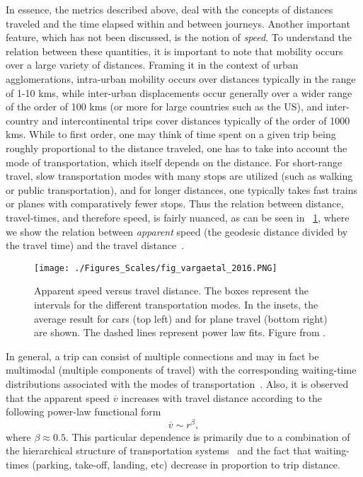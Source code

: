 In essence, the metrics described above, deal with the concepts of distances traveled and the time elapsed within and between journeys. Another important feature, which has not been discussed, is the notion of \emph{speed}. To understand the relation between these quantities, it is important to note that mobility occurs over a large variety of distances. Framing it in the context of urban agglomerations, intra-urban mobility occurs over distances typically in the range of 1-10 kms, while inter-urban displacements occur generally over a wider range of the order of 100 kms (or more for large countries such as the US), and inter-country and intercontinental trips cover distances typically of the order of 1000 kms. While to first order, one may think of time spent on a given trip being roughly proportional to the distance traveled, one has to take into account the mode of transportation, which itself depends on the distance. For short-range travel, slow transportation modes with many stops are utilized (such as walking or public transportation), and for longer distances, one typically takes fast trains or planes with comparatively fewer stops. Thus the relation between distance, travel-times, and therefore speed, is fairly nuanced, as can be seen in \figurename~\ref{fig:scales_varga}, where we show the relation between \emph{apparent} speed (\ie the geodesic  distance divided by the travel time) and the travel distance~\cite{varga_2016_further}.

\begin{figure}[t!]
  \centering
\texttt{[image: ./Figures\_Scales/fig\_vargaetal\_2016.PNG]}
  \caption{Apparent speed versus travel distance. The boxes represent the intervals for the different transportation modes. In the insets, the average result for cars (top left) and for plane travel (bottom right) are shown. The dashed lines represent power law fits. Figure from \cite{varga_2016_further}.}
\label{fig:scales_varga}
\end{figure}

 
In general, a trip can consist of multiple connections and may in fact be multimodal (multiple components of travel) with the corresponding waiting-time distributions associated with the modes of transportation~\cite{gallotti_2014_anatomy}. Also, it is observed that the apparent speed $\overline{v}$ increases with travel distance according to the following power-law functional form~\cite{varga_2016_further} 
\begin{equation}
\overline{v}\sim r^\beta,
\end{equation}
where $\beta\approx 0.5$. This particular dependence is primarily due to a combination of the hierarchical structure of transportation systems~\cite{gallotti_2016_stochastic} and the fact that waiting-times (parking, take-off, landing, etc) decrease in proportion to  trip distance. 

